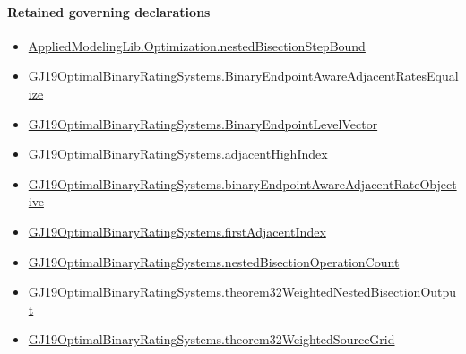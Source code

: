 \documentclass[10pt]{article}
\begin{document}
\paragraph{Retained governing declarations}
\begin{itemize}\raggedright
\item \hyperlink{governing-declaration-1ce9681f6c8e6f0c}{Applied\allowbreak{}Modeling\allowbreak{}Lib.\allowbreak{}Optimization.\allowbreak{}nested\allowbreak{}Bisection\allowbreak{}Step\allowbreak{}Bound}
\item \hyperlink{governing-declaration-5a62c276eedad684}{GJ19\allowbreak{}Optimal\allowbreak{}Binary\allowbreak{}Rating\allowbreak{}Systems.\allowbreak{}Binary\allowbreak{}Endpoint\allowbreak{}Aware\allowbreak{}Adjacent\allowbreak{}Rates\allowbreak{}Equalize}
\item \hyperlink{governing-declaration-aa797f827cdcda67}{GJ19\allowbreak{}Optimal\allowbreak{}Binary\allowbreak{}Rating\allowbreak{}Systems.\allowbreak{}Binary\allowbreak{}Endpoint\allowbreak{}Level\allowbreak{}Vector}
\item \hyperlink{governing-declaration-28fccf34ba067e47}{GJ19\allowbreak{}Optimal\allowbreak{}Binary\allowbreak{}Rating\allowbreak{}Systems.\allowbreak{}adjacent\allowbreak{}High\allowbreak{}Index}
\item \hyperlink{governing-declaration-90a6fa979204b5b7}{GJ19\allowbreak{}Optimal\allowbreak{}Binary\allowbreak{}Rating\allowbreak{}Systems.\allowbreak{}binary\allowbreak{}Endpoint\allowbreak{}Aware\allowbreak{}Adjacent\allowbreak{}Rate\allowbreak{}Objective}
\item \hyperlink{governing-declaration-f116ab8d00b42dc7}{GJ19\allowbreak{}Optimal\allowbreak{}Binary\allowbreak{}Rating\allowbreak{}Systems.\allowbreak{}first\allowbreak{}Adjacent\allowbreak{}Index}
\item \hyperlink{governing-declaration-f9ba8907108dde3e}{GJ19\allowbreak{}Optimal\allowbreak{}Binary\allowbreak{}Rating\allowbreak{}Systems.\allowbreak{}nested\allowbreak{}Bisection\allowbreak{}Operation\allowbreak{}Count}
\item \hyperlink{paper-prerequisite-627505646fe5247e}{GJ19\allowbreak{}Optimal\allowbreak{}Binary\allowbreak{}Rating\allowbreak{}Systems.\allowbreak{}theorem32\allowbreak{}Weighted\allowbreak{}Nested\allowbreak{}Bisection\allowbreak{}Output}
\item \hyperlink{governing-declaration-4d134b86f0f0b0f2}{GJ19\allowbreak{}Optimal\allowbreak{}Binary\allowbreak{}Rating\allowbreak{}Systems.\allowbreak{}theorem32\allowbreak{}Weighted\allowbreak{}Source\allowbreak{}Grid}
\end{itemize}
\end{document}
